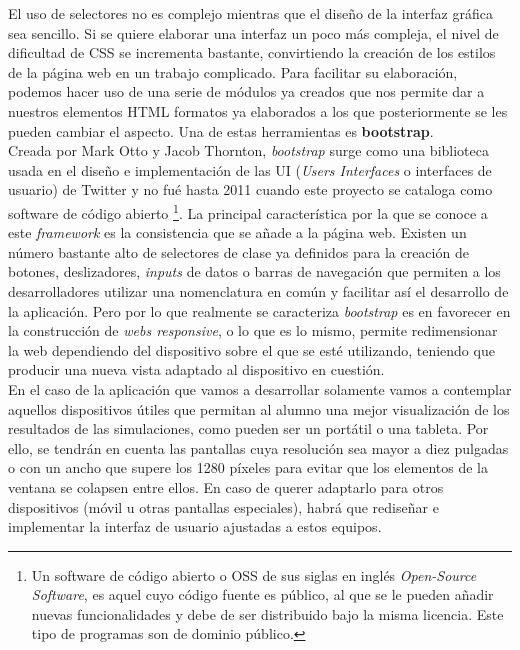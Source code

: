 \documentclass[../main.tex]{subfiles}
\begin{document}
    El uso de selectores no es complejo mientras que el diseño de la interfaz gráfica sea sencillo. Si se quiere elaborar una interfaz un poco más compleja, el nivel de dificultad de CSS se incrementa bastante, convirtiendo la creación de los estilos de la página web en un trabajo complicado. Para facilitar su elaboración, podemos hacer uso de una serie de módulos ya creados que nos permite dar a nuestros elementos HTML formatos ya elaborados a los  que posteriormente se les pueden cambiar el aspecto. Una de estas herramientas es \textbf{bootstrap}.\\
    
    Creada por Mark Otto y Jacob Thornton, \textit{bootstrap} surge como una biblioteca usada en el diseño e implementación de las UI (\textit{Users Interfaces} o interfaces de usuario) de Twitter y no fué hasta 2011 cuando este proyecto se cataloga como software de código abierto \footnote{Un software de código abierto o OSS de sus siglas en inglés \textit{Open-Source Software}, es aquel cuyo código fuente es público, al que se le pueden añadir nuevas funcionalidades y debe de ser distribuido bajo la misma licencia. Este tipo de programas son de dominio público.}. La principal característica por la que se conoce a este \textit{framework} es la consistencia que se añade a la página web. Existen un número bastante alto de selectores de clase ya definidos para la creación de botones, deslizadores, \textit{inputs} de datos o barras de navegación que permiten a los desarrolladores utilizar una nomenclatura en común y facilitar así el desarrollo de la aplicación. Pero por lo que realmente se caracteriza \textit{bootstrap} es en favorecer en la construcción de \textit{webs responsive}, o lo que es lo mismo, permite redimensionar la web dependiendo del dispositivo sobre el que se esté utilizando, teniendo que producir una nueva vista adaptado al dispositivo en cuestión.\\
    
    En el caso de la aplicación que vamos a desarrollar solamente vamos a contemplar aquellos dispositivos útiles que permitan al alumno una mejor visualización de los resultados de las simulaciones, como pueden ser un portátil o una tableta. Por ello, se tendrán en cuenta las pantallas cuya resolución sea mayor a diez pulgadas o con un ancho que supere los 1280 píxeles para evitar que los elementos de la ventana se colapsen entre ellos. En caso de querer adaptarlo para otros dispositivos (móvil u otras pantallas especiales), habrá que rediseñar e implementar la interfaz de usuario ajustadas a estos equipos.
    
\end{document}
